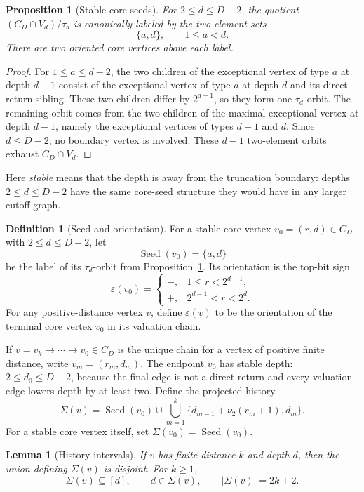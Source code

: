 \documentclass[11pt]{amsart}
\newtheorem{proposition}[theorem]{Proposition}
\newtheorem{lemma}[theorem]{Lemma}
\theoremstyle{definition}
\newtheorem{definition}[theorem]{Definition}
\theoremstyle{remark}
\newcommand{\nuu}{\nu_2}
\newcommand{\Seed}{\operatorname{Seed}}
\newcommand{\eps}{\varepsilon}
\begin{document}
\begin{proposition}[Stable core seeds]\label{prop:seeds}
For $2\le d\le D-2$, the quotient $(C_D\cap V_d)/\tau_d$ is canonically labeled by the two-element sets
\[
\{a,d\},\qquad 1\le a<d.
\]
There are two oriented core vertices above each label.
\end{proposition}

\begin{proof}
For $1\le a\le d-2$, the two children of the exceptional vertex of type $a$ at depth $d-1$ consist of the exceptional vertex of type $a$ at depth $d$ and its direct-return sibling.  These two children differ by $2^{d-1}$, so they form one $\tau_d$-orbit.  The remaining orbit comes from the two children of the maximal exceptional vertex at depth $d-1$, namely the exceptional vertices of types $d-1$ and $d$.  Since $d\le D-2$, no boundary vertex is involved.  These $d-1$ two-element orbits exhaust $C_D\cap V_d$.
\end{proof}

Here \emph{stable} means that the depth is away from the truncation boundary: depths $2\le d\le D-2$ have the same core-seed structure they would have in any larger cutoff graph.

\begin{definition}[Seed and orientation]\label{def:orientation}
For a stable core vertex $v_0=(r,d)\in C_D$ with $2\le d\le D-2$, let
\[
\Seed(v_0)=\{a,d\}
\]
be the label of its $\tau_d$-orbit from Proposition~\ref{prop:seeds}.  Its orientation is the top-bit sign
\[
\eps(v_0)=
\begin{cases}
-,&1\le r<2^{d-1},\\
+,&2^{d-1}<r<2^d.
\end{cases}
\]
For any positive-distance vertex $v$, define $\eps(v)$ to be the orientation of the terminal core vertex $v_0$ in its valuation chain.
\end{definition}

If $v=v_k\to\cdots\to v_0\in C_D$ is the unique chain for a vertex of positive finite distance, write $v_m=(r_m,d_m)$.  The endpoint $v_0$ has stable depth: $2\le d_0\le D-2$, because the final edge is not a direct return and every valuation edge lowers depth by at least two.  Define the projected history
\[
\Sigma(v)=\Seed(v_0)\cup\bigcup_{m=1}^k\{d_{m-1}+\nuu(r_m+1),d_m\}.
\]
For a stable core vertex itself, set $\Sigma(v_0)=\Seed(v_0)$.

\begin{lemma}[History intervals]\label{lem:historyintervals}
If $v$ has finite distance $k$ and depth $d$, then the union defining $\Sigma(v)$ is disjoint.  For $k\ge1$,
\[
\Sigma(v)\subseteq[d],\qquad d\in\Sigma(v),\qquad |\Sigma(v)|=2k+2.
\]
\end{lemma}
\end{document}
